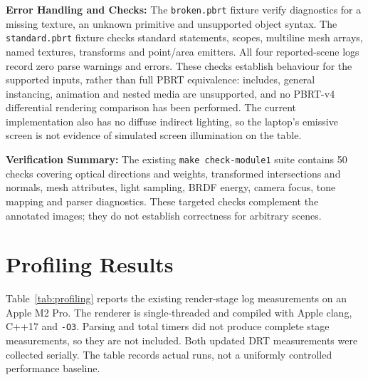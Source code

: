 \documentclass[11pt,a4paper]{article}
\begin{document}
\textbf{Error Handling and Checks:} The \texttt{broken.pbrt} fixture verify diagnostics for a missing texture, an unknown primitive and unsupported object syntax. The \texttt{standard.pbrt} fixture checks standard statements, scopes, multiline mesh arrays, named textures, transforms and point/area emitters. All four reported-scene logs record zero parse warnings and errors. These checks establish behaviour for the supported inputs, rather than full PBRT equivalence: includes, general instancing, animation and nested media are unsupported, and no PBRT-v4 differential rendering comparison has been performed. The current implementation also has no diffuse indirect lighting, so the laptop's emissive screen is not evidence of simulated screen illumination on the table.

\textbf{Verification Summary:} The existing \texttt{make check-module1} suite contains 50 checks covering optical directions and weights, transformed intersections and normals, mesh attributes, light sampling, BRDF energy, camera focus, tone mapping and parser diagnostics. These targeted checks complement the annotated images; they do not establish correctness for arbitrary scenes.

\section{Profiling Results}
Table~\ref{tab:profiling} reports the existing render-stage log measurements on an Apple M2 Pro. The renderer is single-threaded and compiled with Apple clang, C++17 and \texttt{-O3}. Parsing and total timers did not produce complete stage measurements, so they are not included. Both updated DRT measurements were collected serially. The table records actual runs, not a uniformly controlled performance baseline.

\begin{table}[H]
    \centering
    \caption{Logged render-stage times for the current Module 1 images. Samples per pixel are primary rays for WSRT and lens/light samples at fixed pixel centres for DRT. Both DRT runs were serial.}
    \label{tab:profiling}
\end{table}
\end{document}
